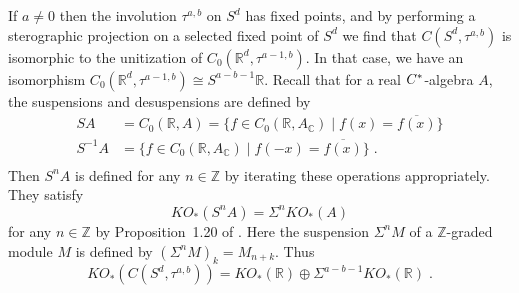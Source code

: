 \documentclass[12pt, reqno]{amsart}
\theoremstyle{definition}
\def\R{{\mathbb R}}
\def\C{{\mathbb C}}
\def\Z{{\mathbb Z}}
\newcommand{\fa}{\mathfrak a}
\begin{document}
If $a \neq 0$ then the involution $\tau^{a,b}$ on $S^d$ has fixed points, and by performing a sterographic projection on a selected fixed point of $S^d$ we find that $C(S^d, \tau^{a,b})$ is isomorphic to the unitization of $C_0(\R^{d}, \tau^{a-1,b})$. In that case, we have an isomorphism $C_0(\R^d, \tau^{a-1,b}) \cong S^{a-b-1} \R$. Recall that for a real $C \sp *$-algebra $A$, the suspensions and desuspensions are defined by
\begin{align*}
SA &= C_0(\R, A) = \{ f \in C_0(\R, A_\C) \mid f(x) = \overline{f(x)} \} \\
S^{-1} A&= \{ f \in C_0(\R, A_\C) \mid f(-x) = \overline{f(x)} \}  \; . \\
\end{align*}
Then $S^n A$ is defined for any $n \in \Z$ by iterating these operations appropriately.
They satisfy
$$KO_*(S^n A) = \Sigma^{n} KO_*(A) $$
for any $n \in \Z$ by Proposition~1.20 of \cite{Boer2002}. 
Here the suspension $\Sigma^n M$ of a $\Z$-graded module $M$ is defined by $(\Sigma^n M)_k = M_{n+k}$.
Thus 
\begin{equation} \label{KOformula} 
KO_*(C(S^d, \tau^{a,b})) = KO_*(\R) \oplus \Sigma^{a-b-1} KO_*(\R) \; .\end{equation}

%
%


%
\end{document}
